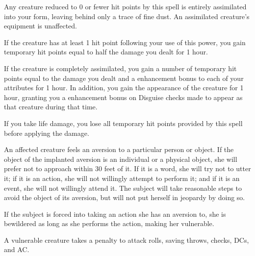 \spellrng{\rngtouch}
\par Any creature reduced to 0 or fewer hit points by this spell is entirely assimilated into your form, leaving behind only a trace of fine dust. An assimilated creature's equipment is unaffected.
\par If the creature has at least 1 hit point following your use of this power, you gain temporary hit points equal to half the damage you dealt for 1 hour.
\par If the creature is completely assimilated, you gain a number of temporary hit points equal to the damage you dealt and a  enhancement bonus to each of your attributes for 1 hour. In addition, you gain the appearance of the creature for 1 hour, granting you a  enhancement bonus on Disguise checks made to appear as that creature during that time.

If you take life damage, you lose all temporary hit points provided by this spell before applying the damage.

\spellrng{\rngmed}
\spelldur{\durext}
\begin{spelleffect}
  An affected creature feels an aversion to a particular person or object. If the object of the implanted aversion is an individual or a physical object, she will prefer not to approach within 30 feet of it. If it is a word, she will try not to utter it; if it is an action, she will not willingly attempt to perform it; and if it is an event, she will not willingly attend it. The subject will take reasonable steps to avoid the object of its aversion, but will not put herself in jeopardy by doing so.
  \par If the subject is forced into taking an action she has an aversion to, she is bewildered as long as she performs the action, making her vulnerable.
\end{spelleffect}
\begin{spellnotes}
  A vulnerable creature takes a  penalty to attack rolls, saving throws, checks, DCs, and AC.
\end{spellnotes}

